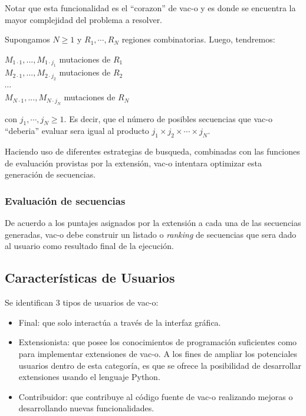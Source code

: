 \documentclass[10pt,a4paper]{article}
\begin{document}
  Notar que esta funcionalidad es el ``corazon'' de vac-o y es donde se encuentra la mayor complejidad del problema a resolver. 

  Supongamos $N \geqslant 1$ y $R_{1}, \cdots, R_{N}$ regiones combinatorias. Luego, tendremos: \\
  \begin{center}    
    $M_{1\cdot1},..., M_{1\cdot j_{1}}$ mutaciones de $R_{1}$\\ 
    $M_{2\cdot1},..., M_{2\cdot j_{2}}$ mutaciones de $R_{2}$\\
    $\cdots$ \\
    $M_{N\cdot1},..., M_{N\cdot j_{N}}$ mutaciones de $R_{N}$   
  \end{center}
  con $j_{1}, \cdots, j_{N} \geqslant 1$. Es decir, que el n\'umero de posibles secuencias que vac-o ``deberia'' evaluar sera igual al producto $j_{1} \times j_{2} \times \cdots \times j_{N}$. 

  Haciendo uso de diferentes estrategias de busqueda, combinadas con las funciones de evaluaci\'on provistas por la extensi\'on, vac-o intentara optimizar esta generaci\'on de secuencias.

  \subsubsection{Evaluaci\'on de secuencias}
  De acuerdo a los puntajes asignados por la extensi\'on a cada una de las secuencias generadas, vac-o debe construir un listado o \textit{ranking} de secuencias que sera dado al usuario como resultado final de la ejecuci\'on.

  \subsection{Caracter\'isticas de Usuarios}
  Se identifican 3 tipos de usuarios de vac-o:
  \begin{itemize}
    \item Final: que solo interact\'ua a trav\'es de la interfaz gr\'afica.
    \item Extensionista: que posee los conocimientos de programaci\'on suficientes como para implementar extensiones de vac-o. A los fines de ampliar los potenciales usuarios dentro de esta categor\'ia, es que se ofrece la posibilidad de desarrollar extensiones usando el lenguaje Python.
    \item Contribuidor: que contribuye al c\'odigo fuente de vac-o realizando mejoras o desarrollando nuevas funcionalidades.
  \end{itemize}
\end{document}
